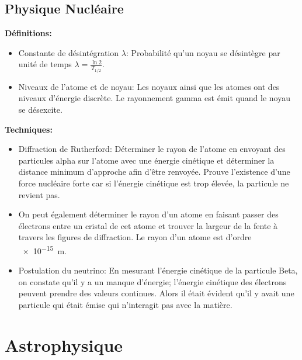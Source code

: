\documentclass[french, a4paper, 12pt]{article}
\begin{document}
\subsection{Physique Nucléaire}
\textbf{Définitions:}
\begin{itemize}
\item Constante de désintégration $\lambda$: Probabilité qu'un noyau se désintègre par unité de temps $\lambda = \frac{\ln 2}{T_{1/2}}$.
\item Niveaux de l'atome et de noyau: Les noyaux ainsi que les atomes ont des niveaux d'énergie discrète. Le rayonnement gamma est émit quand le noyau se désexcite.
\end{itemize}

\textbf{Techniques:}
\begin{itemize}
\item Diffraction de Rutherford: Déterminer le rayon de l'atome en envoyant des particules alpha sur l'atome avec une énergie cinétique et déterminer la distance minimum d'approche afin d'être renvoyée. Prouve l'existence d'une force nucléaire forte car si l'énergie cinétique est trop élevée, la particule ne revient pas.
\item On peut également déterminer le rayon d'un atome en faisant passer des électrons entre un cristal de cet atome et trouver la largeur de la fente à travers les figures de diffraction. Le rayon d'un atome est d'ordre \SI{e-15}{m}.
\item Postulation du neutrino: En mesurant l'énergie cinétique de la particule Beta, on constate qu'il y a un manque d'énergie; l'énergie cinétique des électrons peuvent prendre des valeurs continues. Alors il était évident qu'il y avait une particule qui était émise qui n'interagit pas avec la matière.
\end{itemize}
\pagebreak

\section{Astrophysique}
\end{document}
